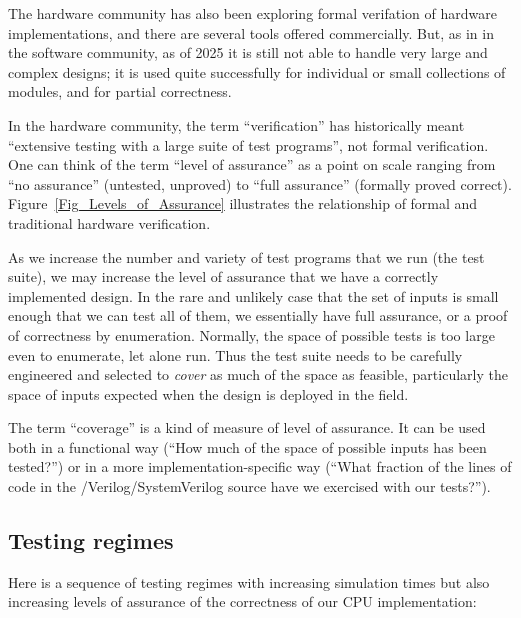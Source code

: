 The hardware community has also been exploring formal verifation of
hardware implementations, and there are several tools offered
commercially.  But, as in in the software community, as of 2025 it is
still not able to handle very large and complex designs; it is used
quite successfully for individual or small collections of modules, and
for partial correctness.

In the hardware community, the term ``verification'' has historically
meant ``extensive testing with a large suite of test programs'', not
formal verification.  One can think of the term ``level of assurance''
as a point on scale ranging from ``no assurance'' (untested, unproved)
to ``full assurance'' (formally proved correct).
Figure~\ref{Fig_Levels_of_Assurance} illustrates the relationship of
formal and traditional hardware verification.

As we increase the number and variety of test programs that we run
(the test suite), we may increase the level of assurance that we have
a correctly implemented design.  In the rare and unlikely case that
the set of inputs is small enough that we can test all of them, we
essentially have full assurance, or a proof of correctness by
enumeration.  Normally, the space of possible tests is too large even
to enumerate, let alone run.  Thus the test suite needs to be
carefully engineered and selected to \emph{cover} as much of the space
as feasible, particularly the space of inputs expected when the design
is deployed in the field.

The term ``coverage'' is a kind of measure of level of assurance.  It
can be used both in a functional way (``How much of the space of
possible inputs has been tested?'') or in a more
implementation-specific way (``What fraction of the lines of code in
the {\BSV}/Veri\-log/System\-Veri\-log source have we exercised with
our tests?'').


\subsection{Testing regimes}

Here is a sequence of testing regimes with increasing simulation times
but also increasing levels of assurance of the correctness of our CPU
implementation:

